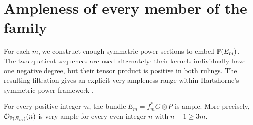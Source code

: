 \section{Ampleness of every member of the family}\label{sec:ampleness}

For each $m$, we construct enough symmetric-power sections to embed
$\mathbb P(E_m)$. The two quotient sequences are used alternately: their
kernels individually have one negative degree, but their tensor product
is positive in both rulings. The resulting filtration gives an explicit
very-ampleness range within Hartshorne's symmetric-power framework
\cite[Corollary~2.5 and Proposition~3.2]{Hartshorne1966}.

\begin{proposition}\label{prop:ampleness}
For every positive integer $m$, the bundle
$E_m=f_m^*G\otimes P$ is ample. More precisely,
$\mathcal O_{\mathbb P(E_m)}(n)$ is very ample for every even integer $n$ with
$n-1\geq3m$.
\end{proposition}

